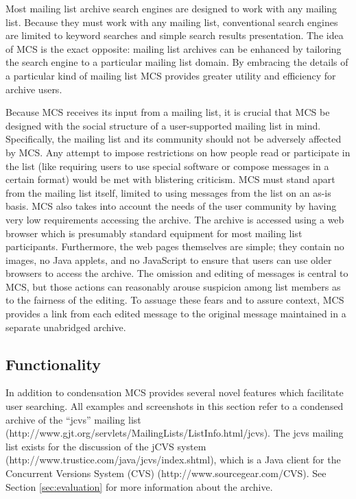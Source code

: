 Most mailing list archive search engines are designed to work with any mailing
list. Because they must work with any mailing list, conventional search engines
are limited to keyword searches and simple search results presentation. The
idea of MCS is the exact opposite: mailing list archives can be enhanced by
tailoring the search engine to a particular mailing list domain. By embracing
the details of a particular kind of mailing list MCS provides greater utility
and efficiency for archive users.

Because MCS receives its input from a mailing list, it is crucial that MCS be
designed with the social structure of a user-supported mailing list in mind.
Specifically, the mailing list and its community should not be adversely
affected by MCS. Any attempt to impose restrictions on how people read or
participate in the list (like requiring users to use special software or
compose messages in a certain format) would be met with blistering criticism.
MCS must stand apart from the mailing list itself, limited to using messages
from the list on an as-is basis. MCS also takes into account the needs of the
user community by having very low requirements accessing the archive. The
archive is accessed using a web browser which is presumably standard equipment
for most mailing list participants. Furthermore, the web pages themselves are
simple; they contain no images, no Java applets, and no JavaScript to ensure
that users can use older browsers to access the archive. The omission and
editing of messages is central to MCS, but those actions can reasonably arouse
suspicion among list members as to the fairness of the editing. To assuage
these fears and to assure context, MCS provides a link from each edited message
to the original message maintained in a separate unabridged archive.

\subsection{Functionality}
In addition to condensation MCS provides several novel features which
facilitate user searching. All examples and screenshots in this section refer
to a condensed archive of the ``jcvs'' mailing list
(http://www.gjt.org/\linebreak[0]servlets/\linebreak[0]MailingLists/\linebreak[0]ListInfo.html/\linebreak[0]jcvs).
The jcvs mailing list exists for the discussion of the jCVS system
(http://www.trustice.com/\linebreak[0]java/\linebreak[0]jcvs/\linebreak[0]index.shtml),
which is a Java client for the Concurrent Versions System (CVS)
(http://www.sourcegear.com/\linebreak[0]CVS). See Section \ref{sec:evaluation}
for more information about the archive.

